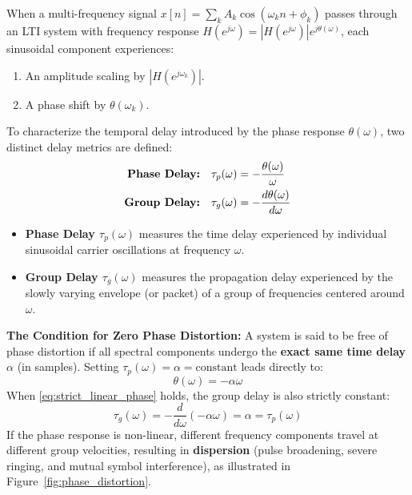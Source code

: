 \documentclass[11pt,a4paper]{article}
\begin{document}
When a multi-frequency signal $x[n] = \sum_{k} A_k \cos(\omega_k n + \phi_k)$ passes through an LTI system with frequency response $H(e^{j\omega}) = |H(e^{j\omega})| e^{j\theta(\omega)}$, each sinusoidal component experiences:
\begin{enumerate}
    \item An amplitude scaling by $|H(e^{j\omega_k})|$.
    \item A phase shift by $\theta(\omega_k)$.
\end{enumerate}
To characterize the temporal delay introduced by the phase response $\theta(\omega)$, two distinct delay metrics are defined:
\begin{align}
\text{\textbf{Phase Delay:}} \quad \tau_p(\omega) &= -\frac{\theta(\omega)}{\omega} \label{eq:phase_delay} \\
\text{\textbf{Group Delay:}} \quad \tau_g(\omega) &= -\frac{d\theta(\omega)}{d\omega} \label{eq:group_delay}
\end{align}
\begin{itemize}
    \item \textbf{Phase Delay $\tau_p(\omega)$} measures the time delay experienced by individual sinusoidal carrier oscillations at frequency $\omega$.
    \item \textbf{Group Delay $\tau_g(\omega)$} measures the propagation delay experienced by the slowly varying envelope (or packet) of a group of frequencies centered around $\omega$.
\end{itemize}

\noindent\textbf{The Condition for Zero Phase Distortion:}
A system is said to be free of phase distortion if all spectral components undergo the \textbf{exact same time delay} $\alpha$ (in samples). Setting $\tau_p(\omega) = \alpha = \text{constant}$ leads directly to:
\begin{equation}
\theta(\omega) = -\alpha \omega
\label{eq:strict_linear_phase}
\end{equation}
When \eqref{eq:strict_linear_phase} holds, the group delay is also strictly constant:
\begin{equation}
\tau_g(\omega) = -\frac{d}{d\omega}(-\alpha \omega) = \alpha = \tau_p(\omega)
\end{equation}
If the phase response is non-linear, different frequency components travel at different group velocities, resulting in \textbf{dispersion} (pulse broadening, severe ringing, and mutual symbol interference), as illustrated in Figure~\ref{fig:phase_distortion}.
\end{document}
